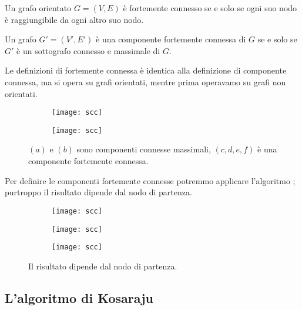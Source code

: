 \begin{definition}
Un grafo orientato \(G = (V,E)\) è \alert{fortemente connesso} se e solo se ogni suo nodo è raggiungibile da ogni altro suo nodo.
\end{definition}

\begin{definition}
Un grafo \(G' = (V',E')\) è una \alert{componente fortemente connessa} di \(G\) se e solo se \(G'\) è un sottografo connesso e massimale di \(G\).
\end{definition}

Le definizioni di fortemente connessa è identica alla definizione di componente connessa, ma si opera su grafi orientati, mentre prima operavamo su grafi non orientati.

\begin{figure}[H]
	\centering
	\hfill
	\begin{subfigure}{.4\textwidth}
		\texttt{[image: scc]}
	\end{subfigure}\hfill
	\begin{subfigure}{.4\textwidth}
		\texttt{[image: scc]}
	\end{subfigure}
	\hfill\null
	\caption[Identificazione della componente fortemente connessa]{\((a)\) e \((b)\) sono componenti connesse massimali, \((c, d, e, f)\) è una componente fortemente connessa.}
\end{figure}

Per definire le componenti fortemente connesse potremmo applicare l'algoritmo \ConnectedComponents; purtroppo il risultato dipende dal nodo di partenza.

\begin{figure}[H]
	\centering
	\begin{subfigure}{.3\textwidth}
		\texttt{[image: scc]}
	\end{subfigure}\hfill
	\begin{subfigure}{.3\textwidth}
		\texttt{[image: scc]}
	\end{subfigure}\hfill
	\begin{subfigure}{.3\textwidth}
		\texttt{[image: scc]}
	\end{subfigure}
	\caption[]{Il risultato dipende dal nodo di partenza.}
\end{figure}

\clearpage
\subsection{L'algoritmo di Kosaraju}

